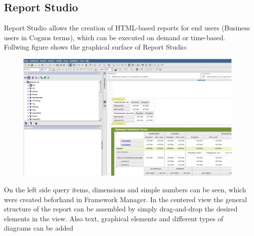 \documentclass[a4paper]{article}
\begin{document}
	\subsection{Report Studio}
	Report Studio allows the creation of HTML-based reports for end users
	(Business users in Cognos terms), which can be executed on demand or
	time-based.\\
	Follwing figure shows the graphical surface of Report Studio: 
	\begin{figure}[!ht]
		  \centering
		      \includegraphics[width=1.0\textwidth]{ReportStudio_2}
		  \caption{}
	\end{figure}
	On the left side query items, dimensions and simple numbers can be seen, which
	were created beforhand in Framework Manager. In the centered view the general
	structure of the report can be assembled by simply drag-and-drop the desired
	elements in the view. Also text, graphical elements and different types of
	diagrams can be added
\end{document}
